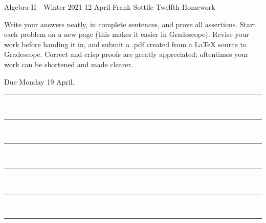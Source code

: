 \documentclass[12pt]{article}
\newcommand{\barsl}{\noindent\begin{minipage}[t]{575pt}
{\color{violet}\rule{575pt}{1.2pt}}\vspace{-5.7mm}\\
{\color{blue}\rule{575pt}{1.2pt}}\vspace{-5.7mm}\\
{\color{green}\rule{575pt}{1.2pt}}\vspace{-5.7mm}\\
{\color{yellow}\rule{575pt}{1.2pt}}\vspace{-5.7mm}\\
{\color{orange}\rule{575pt}{1.2pt}}\vspace{-5.7mm}\\
{\color{red}\rule{575pt}{1.2pt}}
\end{minipage}}
\begin{document}
\LARGE 
\noindent
Algebra II\ \ Winter 2021 \hfill 12 April\makebox[40pt][l]{\ }\newline
Frank Sottile \hfill
\Large\sf
Twelfth Homework\makebox[40pt][l]{\ }
\vspace{5pt}
\normalsize

\noindent
Write your answers neatly, in complete sentences, and prove all assertions.
Start each problem on a new page (this makes it easier in Gradescope).
Revise your work before handing it in, and submit a .pdf  created from a LaTeX source to Gradescope.
Correct and crisp proofs are greatly appreciated; oftentimes your work can be shortened and made clearer.

\noindent
{\color{red}Due Monday 19 April.}\vspace{1pt}

\barsl
\end{document}
